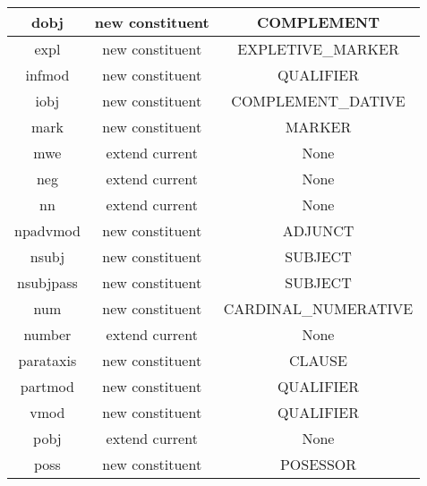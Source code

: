 \begin{table}[]
{\begin{tabular}{|c|c|c|}
            dobj                  & new constituent             & COMPLEMENT                       \\ \hline
            expl                  & new constituent             & EXPLETIVE\_MARKER                \\ \hline
            infmod                & new constituent             & QUALIFIER                        \\ \hline
            iobj                  & new constituent             & COMPLEMENT\_DATIVE               \\ \hline
            mark                  & new constituent             & MARKER                           \\ \hline
            mwe                   & extend current              & None                             \\ \hline
            neg                   & extend current              & None                             \\ \hline
            nn                    & extend current              & None                             \\ \hline
            npadvmod              & new constituent             & ADJUNCT                          \\ \hline
            nsubj                 & new constituent             & SUBJECT                          \\ \hline
            nsubjpass             & new constituent             & SUBJECT                          \\ \hline
            num                   & new constituent             & CARDINAL\_NUMERATIVE             \\ \hline
            number                & extend current              & None                             \\ \hline
            parataxis             & new constituent             & CLAUSE                           \\ \hline
            partmod               & new constituent             & QUALIFIER                        \\ \hline
            vmod                  & new constituent             & QUALIFIER                        \\ \hline
            pobj                  & extend current              & None                             \\ \hline
            poss                  & new constituent             & POSESSOR                         \\ \hline

\end{tabular}}
\end{table}
